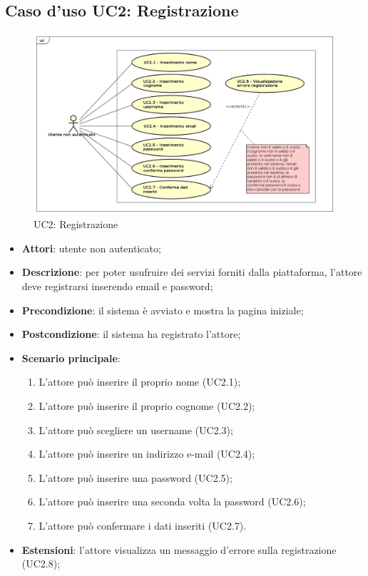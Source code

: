 \newpage
\subsection{Caso d'uso UC2: Registrazione}
\label{UC2}
\begin{figure}[ht]
	\includegraphics[scale=0.45]{UML/UC2.png}
	\caption{UC2: Registrazione}
\end{figure}
\FloatBarrier
\begin{itemize}
\item \textbf{Attori}: utente non autenticato;
\item \textbf{Descrizione}: per poter usufruire dei servizi forniti dalla piattaforma, l'attore deve registrarsi inserendo email e password;
\item \textbf{Precondizione}: il sistema è avviato e mostra la pagina iniziale;
\item \textbf{Postcondizione}: il sistema ha registrato l'attore;
\item \textbf{Scenario principale}:
	\begin{enumerate}
	\item L'attore può inserire il proprio nome (UC2.1);
	\item L'attore può inserire il proprio cognome (UC2.2);
	\item L'attore può scegliere un username (UC2.3);
	\item L'attore può inserire un indirizzo e-mail (UC2.4);
	\item L'attore può inserire una password (UC2.5);
	\item L'attore può inserire una seconda volta la password (UC2.6);
	\item L'attore può confermare i dati inseriti (UC2.7).
	\end{enumerate}
\item \textbf{Estensioni}: l'attore visualizza un messaggio d'errore sulla registrazione (UC2.8);
\end{itemize}

